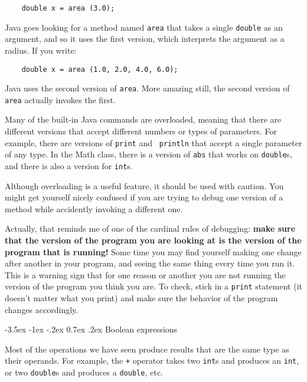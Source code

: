 \documentclass{book}
\makeatletter
\renewcommand{\section}{\@startsection 
    {section} {1} {0mm}%
    {-3.5ex \@plus -1ex \@minus -.2ex}%
    {0.7ex \@plus.2ex}%
    {\normalfont\Large\bfseries}}
\makeatother
\begin{document}
\begin{verbatim}
    double x = area (3.0);
\end{verbatim}
%
Java goes looking for a method named {\tt area} that
takes a single {\tt double} as an argument, and so it uses the
first version, which interprets the argument as a radius.
If you write:

\begin{verbatim}
    double x = area (1.0, 2.0, 4.0, 6.0);
\end{verbatim}
%
Java uses the second version of {\tt area}.  More amazing
still, the second version of {\tt area} actually invokes the
first.

Many of the built-in Java commands are overloaded, meaning that there
are different versions that accept different numbers or types of
parameters.  For example, there are versions of {\tt print} and {\tt
println} that accept a single parameter of any type.  In the Math
class, there is a version of {\tt abs} that works on {\tt double}s,
and there is also a version for {\tt int}s.

Although overloading is a useful feature, it should be used
with caution.  You might get yourself nicely confused if you
are trying to debug one version of a method while accidently
invoking a different one.

Actually, that reminds me of one of the cardinal rules of
debugging: {\bf make sure that the version of the program
you are looking at is the version of the program that is running!}
Some time you may find yourself making one change after another
in your program, and seeing the same thing every time you run it.
This is a warning sign that for one reason or another you are
not running the version of the program you think you are.  To
check, stick in a {\tt print} statement (it doesn't matter what
you print) and make sure the behavior of the program changes
accordingly.

\section{Boolean expressions}

Most of the operations we have seen produce results that are
the same type as their operands.  For example, the {\tt +} operator
takes two {\tt int}s and produces an {\tt int}, or two {\tt double}s
and produces a {\tt double}, etc.

\end{document}
